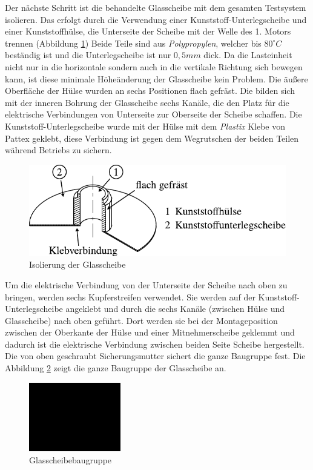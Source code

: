 Der nächste Schritt ist die behandelte Glasscheibe mit dem gesamten Testsystem isolieren.
Das erfolgt durch die Verwendung einer Kunststoff-Unterlegscheibe und einer Kunststoffhülse, die Unterseite der Scheibe mit der Welle des 1. Motors trennen (Abbildung \ref{fig:isolierung_der_glassscheibe})
Beide Teile sind aus \textit{Polypropylen}, welcher bis $80 ^\circ C$ beständig ist und die Unterlegscheibe ist nur $0,5 mm$ dick.
Da die Lasteinheit nicht nur in die horizontale sondern auch in die vertikale Richtung sich bewegen kann, ist diese minimale Höheänderung der Glasscheibe kein Problem.
Die äußere Oberfläche der Hülse wurden an sechs Positionen flach gefräst. Die bilden sich mit der inneren Bohrung der Glasscheibe sechs Kanäle, die den Platz für die elektrische Verbindungen von Unterseite zur Oberseite der Scheibe schaffen.
Die Kunststoff-Unterlegscheibe wurde mit der Hülse mit dem \textit{Plastix} Klebe von Pattex geklebt, diese Verbindung ist gegen dem Wegrutschen der beiden Teilen während Betriebs zu sichern.
\begin{figure}[htb]
    \centering
    \includegraphics[]{./images/isolierung_der_scheibe.pdf}
    \caption{Isolierung der Glasscheibe}
    \label{fig:isolierung_der_glassscheibe}
\end{figure}
%

Um die elektrische Verbindung von der Unterseite der Scheibe nach oben zu bringen, werden sechs Kupferstreifen verwendet.
Sie werden auf der Kunststoff-Unterlegscheibe angeklebt und durch die sechs Kanäle (zwischen Hülse und Glasscheibe) nach oben geführt.
Dort werden sie bei der Montageposition zwischen der Oberkante der Hülse und einer Mitnehmerscheibe geklemmt und dadurch ist die elektrische Verbindung zwischen beiden Seite Scheibe hergestellt.
Die von oben geschraubt Sicherungsmutter sichert die ganze Baugruppe fest.
Die Abbildung \ref{fig:glasscheibebaugruppe} zeigt die ganze Baugruppe der Glasscheibe an.
\begin{figure}[htb]
    \centering
    \includegraphics[width=4cm]{./images/blank_img.jpg}
    \caption{Glasscheibebaugruppe}
    \label{fig:glasscheibebaugruppe}
\end{figure}
%

